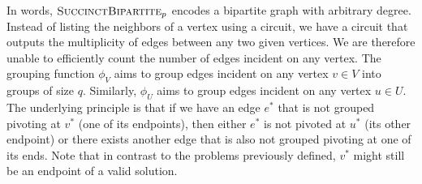 \documentclass[10pt,a4paper]{article}
\theoremstyle{definition}
\theoremstyle{remark}
\newcommand{\sucBipartite}{\ensuremath{\textsc{SuccinctBipartite}}}
\begin{document}
In words, $\sucBipartite_p$ encodes a bipartite graph with arbitrary degree. Instead of listing the neighbors of a vertex using a circuit, we have a circuit that outputs the multiplicity of edges between any two given vertices. We are therefore unable to efficiently count the number of edges incident on any vertex. The grouping function $\phi_V$ aims to group edges incident on any vertex $v \in V$ into groups of size $q$. Similarly, $\phi_U$ aims to group edges incident on any vertex $u \in U$. The underlying principle is that if we have an edge $e^*$ that is not grouped pivoting at $v^*$ (one of its endpoints), then either $e^*$ is not pivoted at $u^*$ (its other endpoint) or there exists another edge that is also not grouped pivoting at one of its ends. Note that in contrast to the problems previously defined, $v^*$ might still be an endpoint of a valid solution.
\end{document}
